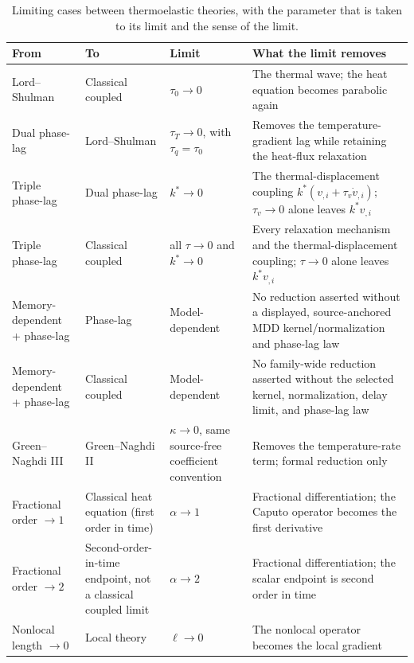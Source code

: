 \begin{table}[htbp]
\centering
\small
\caption{Limiting cases between thermoelastic theories, with the parameter that is taken to its limit and the sense of the limit.}
\label{tab:limiting_cases_revisited}
\begin{tabularx}{\textwidth}{@{}>{\raggedright\arraybackslash}p{2.5cm}>{\raggedright\arraybackslash}p{2.5cm}>{\raggedright\arraybackslash}p{2.2cm}X@{}}
\toprule
\textbf{From} & \textbf{To} & \textbf{Limit} & \textbf{What the limit removes} \\
\midrule
Lord--Shulman & Classical coupled & $\tau_0 \to 0$ & The thermal wave; the heat equation becomes parabolic again \\
Dual phase-lag & Lord--Shulman & $\tau_T \to 0$, with $\tau_q=\tau_0$ & Removes the temperature-gradient lag while retaining the heat-flux relaxation \\
Triple phase-lag & Dual phase-lag & $k^*\to 0$ & The thermal-displacement coupling $k^*(v_{,i}+\tau_v\dot v_{,i})$; $\tau_v\to 0$ alone leaves $k^*v_{,i}$ \\
Triple phase-lag & Classical coupled & all $\tau \to 0$ and $k^*\to 0$ & Every relaxation mechanism and the thermal-displacement coupling; $\tau\to 0$ alone leaves $k^*v_{,i}$ \\
Memory-dependent + phase-lag & Phase-lag & Model-dependent & No reduction asserted without a displayed, source-anchored MDD kernel/normalization and phase-lag law \\
Memory-dependent + phase-lag & Classical coupled & Model-dependent & No family-wide reduction asserted without the selected kernel, normalization, delay limit, and phase-lag law \\
Green--Naghdi III & Green--Naghdi II & $\kappa\to0$, same source-free coefficient convention & Removes the temperature-rate term; formal reduction only \\
Fractional order $\to 1$ & Classical heat equation (first order in time) & $\alpha \to 1$ & Fractional differentiation; the Caputo operator becomes the first derivative \\
Fractional order $\to 2$ & Second-order-in-time endpoint, not a classical coupled limit & $\alpha \to 2$ & Fractional differentiation; the scalar endpoint is second order in time \\
Nonlocal length $\to 0$ & Local theory & $\ell \to 0$ & The nonlocal operator becomes the local gradient \\
\bottomrule
\end{tabularx}
\end{table}

